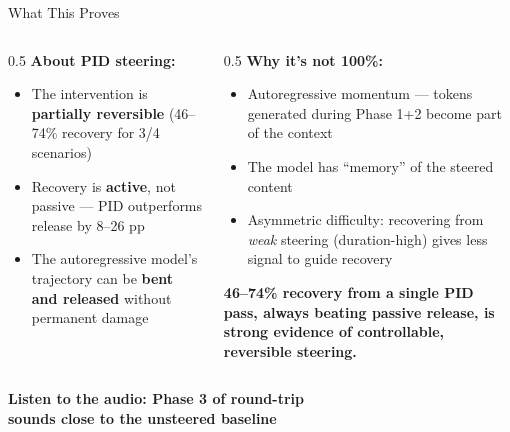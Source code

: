 \documentclass[aspectratio=169]{beamer}
\begin{document}
\begin{frame}{What This Proves}

\begin{columns}[T]
\begin{column}{0.5\textwidth}
\textbf{About PID steering:}
\begin{itemize}
    \item The intervention is \textbf{partially reversible} (46--74\% recovery for 3/4 scenarios)
    \item Recovery is \textbf{active}, not passive --- PID outperforms release by 8--26 pp
    \item The autoregressive model's trajectory can be \textbf{bent and released} without permanent damage
\end{itemize}
\end{column}

\begin{column}{0.5\textwidth}
\textbf{Why it's not 100\%:}
\begin{itemize}
    \item Autoregressive momentum --- tokens generated during Phase 1+2 become part of the context
    \item The model has ``memory'' of the steered content
    \item Asymmetric difficulty: recovering from \emph{weak} steering (duration-high) gives less signal to guide recovery
\end{itemize}

\vspace{0.5em}
\textbf{46--74\% recovery from a single PID pass, always beating passive release, is strong evidence of controllable, reversible steering.}
\end{column}
\end{columns}

\vspace{1.5em}

\begin{center}
\large
\textbf{Listen to the audio: Phase 3 of round-trip\\sounds close to the unsteered baseline}
\end{center}

\end{frame}
\end{document}
